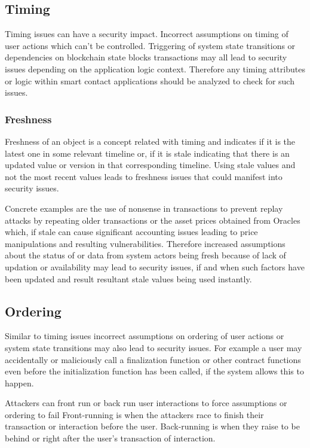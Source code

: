 \subsection{Timing}\label{timing}

Timing issues can have a security impact. Incorrect assumptions on
timing of user actions which can't be controlled. Triggering of system
state transitions or dependencies on blockchain state blocks
transactions may all lead to security issues depending on the
application logic context. Therefore any timing attributes or logic
within smart contact applications should be analyzed to check for such
issues.

\subsubsection{Freshness}\label{freshness}

Freshness of an object is a concept related with timing and indicates if
it is the latest one in some relevant timeline or, if it is stale
indicating that there is an updated value or version in that
corresponding timeline. Using stale values and not the most recent
values leads to freshness issues that could manifest into security
issues.

Concrete examples are the use of nonsense in transactions to prevent
replay attacks by repeating older transactions or the asset prices
obtained from Oracles which, if stale can cause significant accounting
issues leading to price manipulations and resulting vulnerabilities.
Therefore increased assumptions about the status of or data from system
actors being fresh because of lack of updation or availability may lead
to security issues, if and when such factors have been updated and
result resultant stale values being used instantly.

\subsection{Ordering}\label{ordering}

Similar to timing issues incorrect assumptions on ordering of user
actions or system state transitions may also lead to security issues.
For example a user may accidentally or maliciously call a finalization
function or other contract functions even before the initialization
function has been called, if the system allows this to happen.

Attackers can front run or back run user interactions to force
assumptions or ordering to fail Front-running is when the attackers race
to finish their transaction or interaction before the user. Back-running
is when they raise to be behind or right after the user's transaction of
interaction.

